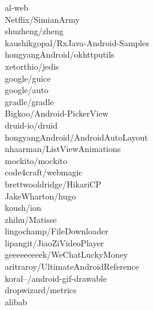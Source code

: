 \documentclass[twoside]{praca}
\begin{document}
\begin{multicols}{3}
al-web\\Netflix/SimianArmy\\shuzheng/zheng\\kaushikgopal/RxJava-Android-Samples\\hongyangAndroid/okhttputils\\xetorthio/jedis\\google/guice\\google/auto\\gradle/gradle\\Bigkoo/Android-PickerView\\druid-io/druid\\hongyangAndroid/Android\-Auto\-Layout\\nhaarman/ListView\-Animations\\mockito/mockito\\code4craft/webmagic\\brettwooldridge/HikariCP\\JakeWharton/hugo\\koush/ion\\zhihu/Matisse\\lingochamp/FileDownloader\\lipangit/JiaoZiVideoPlayer\\geeeeeeeeek/WeChat\-Lucky\-Money\\aritraroy/Ultimate\-Android\-Reference\\koral--/android-gif-drawable\\dropwizard/metrics\\alibab
\end{multicols}
\end{document}
